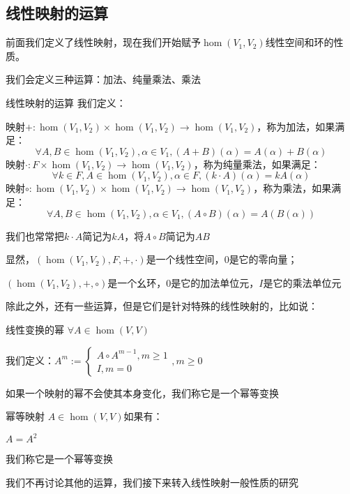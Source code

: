 \documentclass[12pt, a4paper, oneside, UTF8]{ctexbook}
\begin{document}
		\subsection{线性映射的运算}
			前面我们定义了线性映射，现在我们开始赋予$\hom (V_1,V_2)$线性空间和环的性质。

			我们会定义三种运算：加法、纯量乘法、乘法
			\begin{defn}{线性映射的运算}{}
				我们定义：
				
				映射$+:\hom(V_1,V_2) \times \hom(V_1,V_2) \rightarrow \hom(V_1,V_2)$，称为加法，如果满足：
				\begin{equation}
					\forall A,B \in \hom(V_1,V_2),\alpha \in V_1,(A+B)(\alpha )=A(\alpha )+B(\alpha )
				\end{equation}
				映射$\cdot:F \times \hom(V_1,V_2) \rightarrow \hom(V_1,V_2)$，称为纯量乘法，如果满足：
				\begin{equation}
					\forall k \in F,A \in \hom(V_1,V_2),\alpha \in F,(k\cdot A)(\alpha )=kA(\alpha )
				\end{equation}
				映射$\circ:\hom(V_1,V_2) \times \hom(V_1,V_2) \rightarrow \hom(V_1,V_2)$，称为乘法，如果满足：
				\begin{equation}
					\forall A,B \in \hom(V_1,V_2),\alpha \in V_1,(A\circ B)(\alpha )=A\left(B(\alpha )\right)
				\end{equation}
			\end{defn}
			我们也常常把$k\cdot A$简记为$kA$，将$A \circ B$简记为$AB$

			显然，$\left(\hom(V_1,V_2),F,+,\cdot\right)$是一个线性空间，$0$是它的零向量；

			$\left(\hom(V_1,V_2),+,\circ\right)$是一个幺环，$0$是它的加法单位元，$I$是它的乘法单位元

			除此之外，还有一些运算，但是它们是针对特殊的线性映射的，比如说：
			\begin{defn}{线性变换的幂}{}
				$\forall A \in \hom(V,V)$

				我们定义：$A^m:= \begin{cases}
					A\circ A^{m-1},m \geqslant 1 \\
					I,m = 0
				\end{cases},m \geqslant 0$
			\end{defn}
			如果一个映射的幂不会使其本身变化，我们称它是一个幂等变换
			\begin{defn}{幂等映射}{}
				$A \in \hom(V,V)$如果有：

				$A = A^2$

				我们称它是一个幂等变换
			\end{defn}
			我们不再讨论其他的运算，我们接下来转入线性映射一般性质的研究
\end{document}
